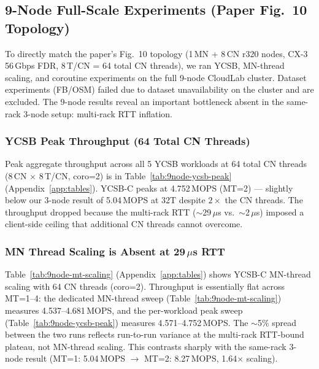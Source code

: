 \documentclass[conference]{IEEEtran}
\begin{document}
\subsection{9-Node Full-Scale Experiments (Paper Fig.~10 Topology)}\label{sec:repro-9node}

To directly match the paper's Fig.~10 topology (1\,MN + 8\,CN r320 nodes, CX-3 56\,Gbps FDR, 8\,T/CN = 64 total CN threads), we ran YCSB, MN-thread scaling, and coroutine experiments on the full 9-node CloudLab cluster. Dataset experiments (FB/OSM) failed due to dataset unavailability on the cluster and are excluded. The 9-node results reveal an important bottleneck absent in the same-rack 3-node setup: multi-rack RTT inflation.

\subsubsection{YCSB Peak Throughput (64 Total CN Threads)}

Peak aggregate throughput across all 5 YCSB workloads at 64 total CN threads (8\,CN $\times$ 8\,T/CN, coro=2) is in Table~\ref{tab:9node-ycsb-peak} (Appendix~\ref{app:tables}). YCSB-C peaks at 4.752\,MOPS (MT=2) --- slightly below our 3-node result of 5.04\,MOPS at 32T despite $2\times$ the CN threads. The throughput dropped because the multi-rack RTT ($\sim$29\,$\mu$s vs.\ $\sim$2\,$\mu$s) imposed a client-side ceiling that additional CN threads cannot overcome.

\subsubsection{MN Thread Scaling is Absent at 29\,$\mu$s RTT}

Table~\ref{tab:9node-mt-scaling} (Appendix~\ref{app:tables}) shows YCSB-C MN-thread scaling with 64 CN threads (coro=2). Throughput is essentially flat across MT=1--4: the dedicated MN-thread sweep (Table~\ref{tab:9node-mt-scaling}) measures 4.537--4.681\,MOPS, and the per-workload peak sweep (Table~\ref{tab:9node-ycsb-peak}) measures 4.571--4.752\,MOPS. The $\sim$5\% spread between the two runs reflects run-to-run variance at the multi-rack RTT-bound plateau, not MN-thread scaling. This contrasts sharply with the same-rack 3-node result (MT=1: 5.04\,MOPS $\to$ MT=2: 8.27\,MOPS, 1.64$\times$ scaling).
\end{document}
